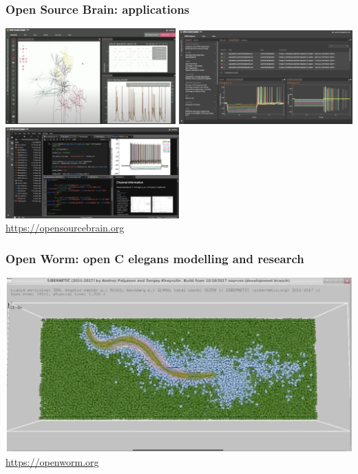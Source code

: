 \begin{frame}[c]
  \frametitle{Open Source Brain: applications}
  \begin{center}
    \includegraphics[keepaspectratio,width=0.49\textwidth]{./99_images/Netpyne}
    \includegraphics[keepaspectratio,width=0.5\textwidth]{./99_images/nwbe}\\\vspace{2ex}
    \includegraphics[keepaspectratio,width=0.5\textwidth]{./99_images/jlab}\\\vspace{1ex}
    \url{https://opensourcebrain.org}
  \end{center}
\end{frame}
\begin{frame}[c]
  \frametitle{Open Worm: open C elegans modelling and research}
  \begin{center}
    \includegraphics[keepaspectratio,width=\textwidth]{./99_images/sibernetic}\vspace{1ex}
    \url{https://openworm.org}
  \end{center}
\end{frame}
